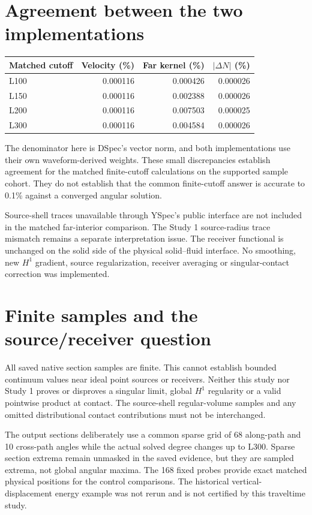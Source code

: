 \documentclass[11pt,a4paper]{article}
\begin{document}
\newpage
\section{Agreement between the two implementations}
\begin{center}\small\begin{tabular}{lrrr}\toprule
Matched cutoff & Velocity (\%) & Far kernel (\%) & $|\Delta N|$ (\%)\\\midrule
L100 & 0.000116 & 0.000426 & 0.000026 \\
L150 & 0.000116 & 0.002388 & 0.000026 \\
L200 & 0.000116 & 0.007503 & 0.000025 \\
L300 & 0.000116 & 0.004584 & 0.000026 \\
\bottomrule\end{tabular}\end{center}
The denominator here is DSpec's vector norm, and both implementations use their own waveform-derived weights. These small discrepancies establish agreement for the matched finite-cutoff calculations on the supported sample cohort. They do not establish that the common finite-cutoff answer is accurate to 0.1\% against a converged angular solution.

Source-shell traces unavailable through YSpec's public interface are not included in the matched far-interior comparison. The Study 1 source-radius trace mismatch remains a separate interpretation issue. The receiver functional is unchanged on the solid side of the physical solid--fluid interface. No smoothing, new $H^1$ gradient, source regularization, receiver averaging or singular-contact correction was implemented.

\section{Finite samples and the source/receiver question}
All saved native section samples are finite. This cannot establish bounded continuum values near ideal point sources or receivers. Neither this study nor Study 1 proves or disproves a singular limit, global $H^1$ regularity or a valid pointwise product at contact. The source-shell regular-volume samples and any omitted distributional contact contributions must not be interchanged.

The output sections deliberately use a common sparse grid of 68 along-path and 10 cross-path angles while the actual solved degree changes up to L300. Sparse section extrema remain unmasked in the saved evidence, but they are sampled extrema, not global angular maxima. The 168 fixed probes provide exact matched physical positions for the control comparisons. The historical vertical-displacement energy example was not rerun and is not certified by this traveltime study.
\end{document}
